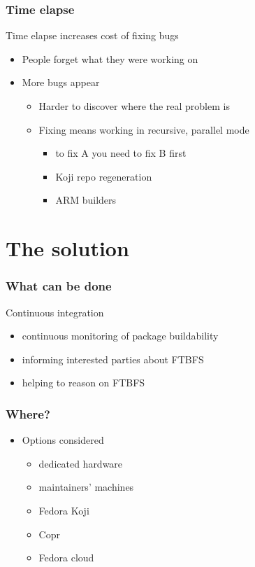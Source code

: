 \documentclass[pdftex,unicode,xcolor=table]{beamer}
\begin{document}
\begin{frame}
  \frametitle{Time elapse}
  Time elapse increases cost of fixing bugs
  \begin{itemize}
  \item People forget what they were working on
  \item More bugs appear
    \begin{itemize}
      \item Harder to discover where the real problem is
      \item Fixing means working in recursive, parallel mode
      \begin{itemize}
        \item to fix A you need to fix B first
        \item Koji repo regeneration
        \item ARM builders
      \end{itemize}
    \end{itemize}
  \end{itemize}
\end{frame}


\section{The solution}
\Large
\begin{frame}
  \frametitle{What can be done}
  Continuous integration
  \begin{itemize}
    \item continuous monitoring of package buildability
    \item informing interested parties about FTBFS
    \item helping to reason on FTBFS
  \end{itemize}
\end{frame}

\begin{frame}
  \frametitle{Where?}
  \begin{itemize}
  \item Options considered
    \begin{itemize}
      \item dedicated hardware
      \item maintainers' machines
      \item Fedora Koji
      \item Copr
      \item Fedora cloud
    \end{itemize}
  \end{itemize}
\end{frame}
\end{document}
